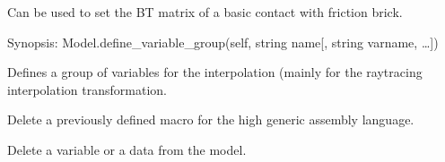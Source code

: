 \documentclass[a4paper,11pt,english]{sphinxmanual}
\begin{document}
\begin{fulllineitems}
\begin{fulllineitems}
\end{fulllineitems}


\begin{fulllineitems}
\label{\detokenize{python/cmdref_Model:getfem.Model.contact_brick_set_BT}}
Can be used to set the BT matrix of a basic contact with
friction brick.

\end{fulllineitems}


\begin{fulllineitems}
\label{\detokenize{python/cmdref_Model:getfem.Model.define_variable_group}}
Synopsis: Model.define\_variable\_group(self, string name{[}, string varname, …{]})

Defines a group of variables for the interpolation (mainly for the
raytracing interpolation transformation.

\end{fulllineitems}


\begin{fulllineitems}
\label{\detokenize{python/cmdref_Model:getfem.Model.del_macro}}
Delete a previously defined macro for the high generic assembly language.

\end{fulllineitems}


\begin{fulllineitems}
\label{\detokenize{python/cmdref_Model:getfem.Model.delete_brick}}
Delete a variable or a data from the model.


\end{fulllineitems}
\end{fulllineitems}
\end{document}
